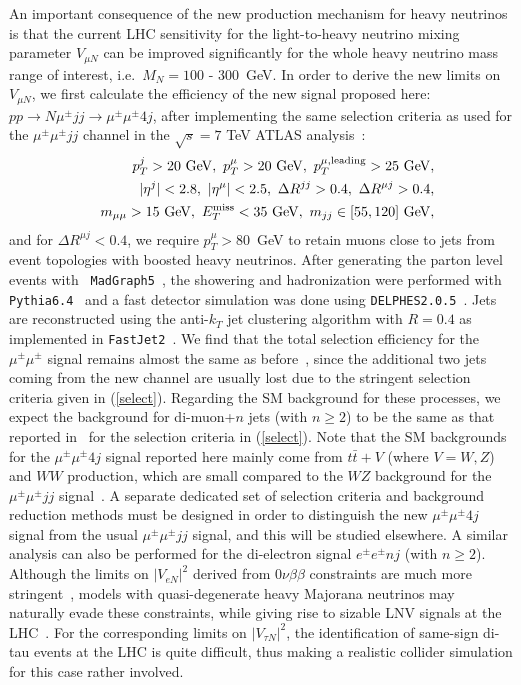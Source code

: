 \documentclass[reprint,prl,twocolumn,superscriptaddress,showpacs,nofootinbib,floatfix,preprintnumbers]{revtex4-1}
\begin{document}
An  important consequence of  the new  production mechanism  for heavy
neutrinos is  that the current LHC sensitivity  for the light-to-heavy
neutrino mixing  parameter $V_{\mu  N}$ can be  improved significantly
for the whole heavy neutrino  mass range of interest, i.e.~$M_N = 100$
- 300~GeV. In order to derive the  new limits on $V_{\mu N}$, we first
calculate  the efficiency  of  the new  signal  proposed here:  $pp\to
N\mu^\pm  jj\to  \mu^\pm  \mu^\pm  4j$, after  implementing  the  same
selection criteria as used for  the $\mu^\pm\mu^\pm jj$ channel in the
$\sqrt s=7$ TeV ATLAS analysis~\cite{ATLAS-LL}:
\begin{eqnarray}
&&p_T^j>20~{\rm GeV},~p_T^\mu >20~{\rm GeV},~
p_T^{\mu,{\rm leading}}>25~{\rm GeV},\nonumber\\
&& |\eta^j|<2.8,~|\eta^\mu|<2.5, ~\Delta R^{jj}>0.4, ~\Delta R^{\mu
  j} > 0.4, \label{select}\\ 
&& m_{\mu\mu} > 15~{\rm GeV}, ~E_T^{\rm miss}<35~{\rm GeV}, ~m_{jj} \in
[55,120]~{\rm GeV}, \nonumber 
\end{eqnarray}
and for $\Delta R^{\mu  j}<0.4$, we require  $p_T^\mu>80$~GeV to
retain muons  close to jets  from event topologies with  boosted heavy
neutrinos.   After  generating  the  parton  level  events  with  {\tt
  MadGraph5}~\cite{mg5},   the   showering   and  hadronization   were
performed  with  {\tt  Pythia6.4}~\cite{pythia}  and a  fast  detector
simulation was done using {\tt DELPHES2.0.5}~\cite{delphes}.  Jets are
reconstructed  using the  anti-$k_T$ jet  clustering algorithm  with 
$R=0.4$ as  implemented in {\tt FastJet2}~\cite{fastjet}. We
find  that the  total  selection efficiency  for the  $\mu^\pm\mu^\pm$
signal remains  almost the  same as before~\cite{ATLAS-LL},  since the
additional two jets  coming from the new channel  are usually lost due
to the  stringent selection criteria given in  (\ref{select}).  Regarding 
the  SM background  for these  processes,  we expect the background for
di-muon+$n$  jets (with $n\geq  2$) to  be the  same as  that reported
in~\cite{ATLAS-LL} for the  selection criteria in (\ref{select}). 
Note that the SM backgrounds for the $\mu^\pm\mu^\pm 4j$ 
signal reported here mainly come from $t\bar t+V$ (where $V=W,Z$) and $WW$ production, which are small compared to the $WZ$ background 
for the $\mu^\pm\mu^\pm jj$ signal~\cite{ATLAS-LL}. 
A separate dedicated set of selection criteria and
background reduction methods must  be designed in order to distinguish
the new $\mu^\pm\mu^\pm 4j$  signal from the usual $\mu^\pm\mu^\pm jj$
signal,  and this  will be  studied  elsewhere.  A  similar
analysis can  also be performed  for the di-electron signal $e^\pm  e^\pm nj$ 
(with $n\geq 2$). Although  the   limits  on  $|V_{eN}|^2$   derived  from
$0\nu\beta\beta$    constraints   are    much   more
stringent~\cite{atre}, models  with  quasi-degenerate heavy
Majorana neutrinos  may naturally evade  these constraints, while 
giving rise to sizable LNV signals at the LHC~\cite{BLP}.
For  the  corresponding  limits  on  $|V_{\tau  N}|^2$,  the
identification  of  same-sign  di-tau  events  at  the  LHC  is  quite
difficult, thus making a realistic collider simulation for this case rather involved.
\end{document}
